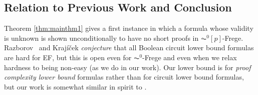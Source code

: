 \documentclass[11pt,letter]{article}
\theoremstyle{remark} %
\newcommand{\rahul}{\Rahul}
\newcommand{\Rahul}[1]%
{%
    [%
        {   
                {%
            \textcolor{green}%
                    {\footnotesize{Rahul: #1}}%
                }%
        }%
    ]%
}
\begin{document}
{%
    






    \subsection{Relation to Previous Work and Conclusion}

 

    Theorem \ref{thm:mainthm1} gives a first instance in which a formula whose validity is unknown is shown unconditionally to have no short proofs in $\AC^0[p]$-Frege. Razborov~\cite{Razb96} and Kraj\'{i}\v{c}ek \cite{Krajicek04c} {\it conjecture} that all Boolean circuit lower bound formulas are hard for EF, but this is open even for $\AC^0$-Frege and even when we relax hardness to being non-easy (as we do in our work). Our lower bound is for {\it proof complexity lower bound} formulas rather than for circuit lower bound formulas, but our work is somewhat similar in spirit to \cite{Razb95}.

}
\end{document}
